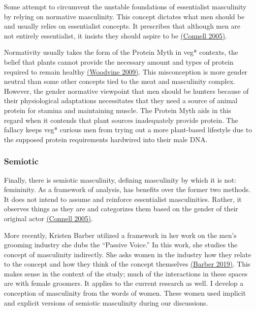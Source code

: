 Some attempt to circumvent the unstable foundations of essentialist masculinity by relying on normative masculinity. This concept dictates what men should be and usually relies on essentialist concepts. It prescribes that although men are not entirely essentialist, it insists they should aspire to be \hyperlink{connell}{(Connell 2005)}.

Normativity usually takes the form of the Protein Myth in veg* contexts, the belief that plants cannot provide the necessary amount and types of protein required to remain healthy \hyperlink{woodvine}{(Woodvine 2009)}. This misconception is more gender neutral than some other concepts tied to the meat and masculinity complex. However, the gender normative viewpoint that men should be hunters because of their physiological adaptations necessitates that they need a source of animal protein for stamina and maintaining muscle. The Protein Myth aids in this regard when it contends that plant sources inadequately provide protein. The fallacy keeps veg* curious men from trying out a more plant-based lifestyle due to the supposed protein requirements hardwired into their male DNA.

\subsubsection{Semiotic}

Finally, there is semiotic masculinity, defining masculinity by which it is not: femininity. As a framework of analysis, has benefits over the former two methods. It does not intend to assume and reinforce essentialist masculinities. Rather, it observes things as they are and categorizes them based on the gender of their original actor \hyperlink{connell}{(Connell 2005)}.

More recently, Kristen Barber utilized a framework in her work on the men's grooming industry she dubs the ``Passive Voice.'' In this work, she studies the concept of masculinity indirectly. She asks women in the industry how they relate to the concept and how they think of the concept themselves \hyperlink{barber2}{(Barber 2019)}. This makes sense in the context of the study; much of the interactions in these spaces are with female groomers. It applies to the current research as well. I develop a conception of masculinity from the words of women. These women used implicit and explicit versions of semiotic masculinity during our discussions.

